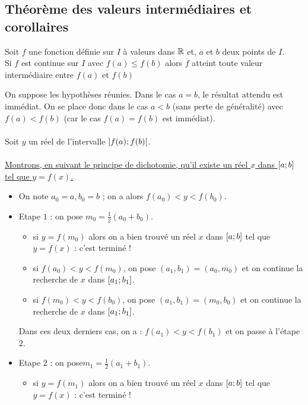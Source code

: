 \subsection{Théorème des valeurs intermédiaires et corollaires}
\begin{theo} 
Soit \(f\) une fonction définie sur \(I\) à valeurs dans \(\mathbb{R}\) et, \(a\) et \(b\) deux points de \(I\).\\
Si \(f\) est continue sur \(I\) avec \(f (a) \leq f (b)\) alors \(f\)\(\) atteint toute valeur intermédiaire entre \(f (a)\) et \(f (b)\)
\end{theo}
\begin{dem}
    On suppose les hypothèses réunies. Dans le cas \(a = b\), le résultat attendu est immédiat. On se place donc dans le cas \(a < b\) (sans perte de généralité) avec \(f (a) < f (b)\) (car le cas \(f (a) = f (b)\) est immédiat).\\~\\
Soit \(y\) un réel de l’intervalle \(\left]f(a);f(b)\right[\).\\~\\
\underline{Montrons, en suivant le principe de dichotomie, qu’il existe un réel \(x\) dans \(\left[a;b\right] \) tel que \(y = f (x)\).
}
\begin{itemize}
    \item On note \(a_0 = a, b_0 = b\) ; on a alors \( f (a_0) < y < f (b_0)\).\\
    \item Etape \(1\) : on pose \( m_0 = \frac{1}{2}(a_0 + b_0)\).
        \begin{itemize}
            \item si \(y = f (m_0)\) alors on a bien trouvé un réel \(x\) dans \(\left[a;b\right] \) tel que \(y = f (x)\) : c’est terminé !
            \item si \(f (a_0) < y < f (m_0)\), on pose \((a_1, b_1) = (a_0, m_0)\) et on continue la recherche de \(x\) dans \(\left[a_1;b_1\right] \).
            \item si \(f (m_0) < y < f (b_0)\), on pose \((a_1, b_1) = (m_0, b_0)\) et on continue la recherche de \(x\) dans \(\left[a_1;b_1\right] \).
        \end{itemize}
        Dans ces deux derniers cas, on a : \(f (a_1) < y < f (b_1)\) et on passe à l’étape \(2\).
    \item Etape \(2\) : on pose\( m_1 = \frac{1}{2}(a_1 + b_1)\).
        \begin{itemize}
            \item si \(y = f (m_1)\) alors on a bien trouvé un réel \(x\) dans \(\left[a;b\right] \) tel que \(y = f (x)\) : c’est terminé !

\end{itemize}
\end{itemize}
\end{dem}
